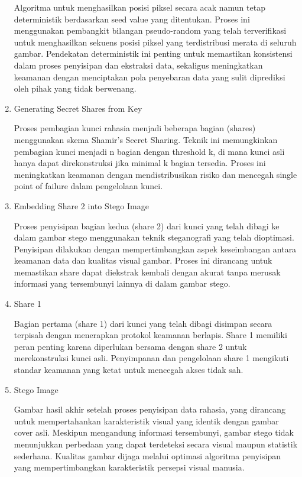 \documentclass{ittelkom}
\begin{document}
\begin{enumerate}
          Algoritma untuk menghasilkan posisi piksel secara acak namun tetap
          deterministik berdasarkan seed value yang ditentukan. Proses ini menggunakan
          pembangkit bilangan pseudo-random yang telah terverifikasi untuk menghasilkan
          sekuens posisi piksel yang terdistribusi merata di seluruh gambar. Pendekatan
          deterministik ini penting untuk memastikan konsistensi dalam proses penyisipan
          dan ekstraksi data, sekaligus meningkatkan keamanan dengan menciptakan pola
          penyebaran data yang sulit diprediksi oleh pihak yang tidak berwenang.

    \item Generating Secret Shares from Key

          Proses pembagian kunci rahasia menjadi beberapa bagian (shares) menggunakan
          skema Shamir's Secret Sharing. Teknik ini memungkinkan pembagian kunci menjadi
          n bagian dengan threshold k, di mana kunci asli hanya dapat direkonstruksi jika
          minimal k bagian tersedia. Proses ini meningkatkan keamanan dengan
          mendistribusikan risiko dan mencegah single point of failure dalam pengelolaan
          kunci.

    \item Embedding Share 2 into Stego Image

          Proses penyisipan bagian kedua (share 2) dari kunci yang telah dibagi ke dalam
          gambar stego menggunakan teknik steganografi yang telah dioptimasi. Penyisipan
          dilakukan dengan mempertimbangkan aspek keseimbangan antara keamanan data dan
          kualitas visual gambar. Proses ini dirancang untuk memastikan share dapat
          diekstrak kembali dengan akurat tanpa merusak informasi yang tersembunyi
          lainnya di dalam gambar stego.

    \item Share 1

          Bagian pertama (share 1) dari kunci yang telah dibagi disimpan secara terpisah
          dengan menerapkan protokol keamanan berlapis. Share 1 memiliki peran penting
          karena diperlukan bersama dengan share 2 untuk merekonstruksi kunci asli.
          Penyimpanan dan pengelolaan share 1 mengikuti standar keamanan yang ketat untuk
          mencegah akses tidak sah.

    \item Stego Image

          Gambar hasil akhir setelah proses penyisipan data rahasia, yang dirancang untuk
          mempertahankan karakteristik visual yang identik dengan gambar cover asli.
          Meskipun mengandung informasi tersembunyi, gambar stego tidak menunjukkan
          perbedaan yang dapat terdeteksi secara visual maupun statistik sederhana.
          Kualitas gambar dijaga melalui optimasi algoritma penyisipan yang
          mempertimbangkan karakteristik persepsi visual manusia.


\end{enumerate}
\end{document}
